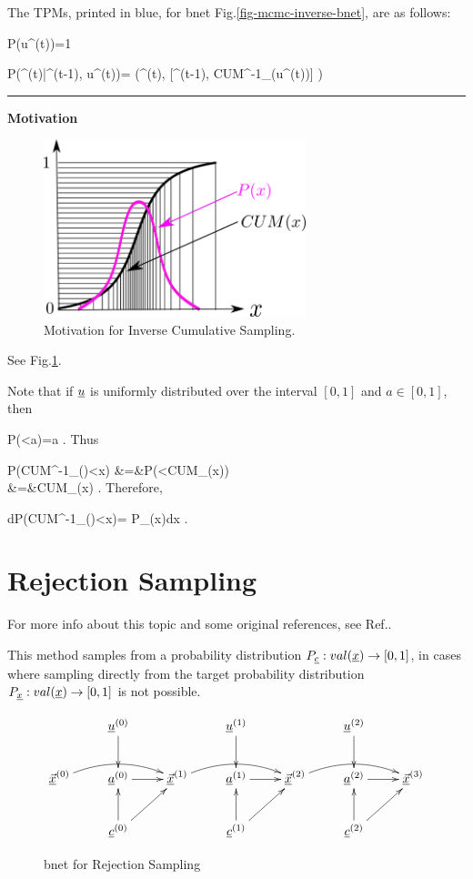 The TPMs, printed
in blue, for  bnet
 Fig.\ref{fig-mcmc-inverse-bnet}, are
as follows:

\beq\color{blue}
P(u^{(t)})=1
\eeq

\beq\color{blue}
P(\vecx^{(t)}|\vecx^{(t-1)}, u^{(t)})=
\delta(\;\;\;\vecx^{(t)},
[\vecx^{(t-1)}, CUM^{-1}_\rvx(u^{(t)})]
\;\;\;)
\eeq

\hrule\noindent
{\bf Motivation}

\begin{figure}[h!]
\centering
\includegraphics[width=3in]
{mcmc/inverse.png}
\caption{Motivation 
for Inverse Cumulative Sampling.} 
\label{fig-mcmc-inverse}
\end{figure}
See Fig.\ref{fig-mcmc-inverse}.


Note that if 
$\rvu$ is uniformly distributed over 
the interval $[0,1]$ and $a\in[0,1]$, then

\beq
P(\rvu<a)=a
\;.
\eeq
Thus

\beqa
P(CUM^{-1}_\rvx(\rvu)<x)
&=&P(\rvu<CUM_\rvx(x))
\\
&=&CUM_\rvx(x)
\;.
\eeqa
Therefore,

\beq
dP(CUM^{-1}_\rvx(\rvu)<x)=
P_\rvx(x)dx
\;.
\eeq


\section{Rejection Sampling}

For more info about this topic 
and some original references, 
see Ref.\cite{wiki-reject}.

This method samples
from a  probability distribution
$P_\rvc:val(\rvx)\rarrow [0,1]$,
in cases where sampling directly
from the
target probability distribution
$P_\rvx:val(\rvx)\rarrow [0,1]$
is not possible.


\begin{figure}[h!]
$$\xymatrix{
&\rvu^{(0)}\ar[d]
&&\rvu^{(1)}\ar[d]
&&\rvu^{(2)}\ar[d]
\\
\ul{\vecx}^{(0)}\ar@/^1pc/[rr]
&\rva^{(0)}\ar[r]
&
\ul{\vecx}^{(1)}\ar@/^1pc/[rr]
&\rva^{(1)}\ar[r]
&
\ul{\vecx}^{(2)}\ar@/^1pc/[rr]
&\rva^{(2)}\ar[r]
&\ul{\vecx}^{(3)}
\\
&\rvc^{(0)}\ar[u]\ar[ru]
&&\rvc^{(1)}\ar[u]\ar[ru]
&&\rvc^{(2)}\ar[u]\ar[ru]
}$$
\caption{bnet for Rejection Sampling}
\label{fig-mcmc-reject-bnet}
\end{figure}

